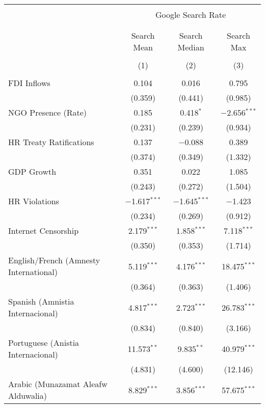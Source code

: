 
\begin{table}[!htbp] \centering 
  \caption{} 
  \label{} 
\begin{tabular}{@{\extracolsep{5pt}}lccc} 
\\[-1.8ex]\hline 
\hline \\[-1.8ex] 
 & \multicolumn{3}{c}{Google Search Rate} \\ 
\cline{2-4} 
\\[-1.8ex] & \multicolumn{3}{c}{ } \\ 
 & Search Mean & Search Median & Search Max \\ 
\\[-1.8ex] & (1) & (2) & (3)\\ 
\hline \\[-1.8ex] 
 FDI Inflows & 0.104 & 0.016 & 0.795 \\ 
  & (0.359) & (0.441) & (0.985) \\ 
  NGO Presence (Rate) & 0.185 & 0.418$^{*}$ & $-$2.656$^{***}$ \\ 
  & (0.231) & (0.239) & (0.934) \\ 
  HR Treaty Ratifications & 0.137 & $-$0.088 & 0.389 \\ 
  & (0.374) & (0.349) & (1.332) \\ 
  GDP Growth & 0.351 & 0.022 & 1.085 \\ 
  & (0.243) & (0.272) & (1.504) \\ 
  HR Violations & $-$1.617$^{***}$ & $-$1.645$^{***}$ & $-$1.423 \\ 
  & (0.234) & (0.269) & (0.912) \\ 
  Internet Censorship & 2.179$^{***}$ & 1.858$^{***}$ & 7.118$^{***}$ \\ 
  & (0.350) & (0.353) & (1.714) \\ 
  English/French (Amnesty International) & 5.119$^{***}$ & 4.176$^{***}$ & 18.475$^{***}$ \\ 
  & (0.364) & (0.363) & (1.406) \\ 
  Spanish (Amnistia Internacional) & 4.817$^{***}$ & 2.723$^{***}$ & 26.783$^{***}$ \\ 
  & (0.834) & (0.840) & (3.166) \\ 
  Portuguese (Anistia Internacional) & 11.573$^{**}$ & 9.835$^{**}$ & 40.979$^{***}$ \\ 
  & (4.831) & (4.600) & (12.146) \\ 
  Arabic (Munazamat Aleafw Alduwalia) & 8.829$^{***}$ & 3.856$^{***}$ & 57.675$^{***}$ \\ 

\end{tabular}
\end{table}
